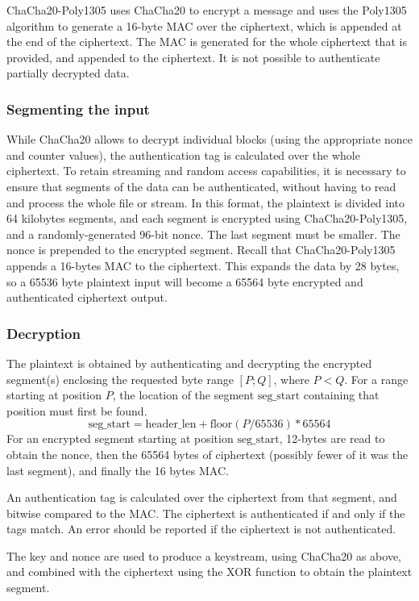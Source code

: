 ChaCha20-Poly1305 uses ChaCha20 to encrypt a message and uses the
Poly1305 algorithm to generate a 16-byte MAC over the ciphertext,
which is appended at the end of the ciphertext.
%
The MAC is generated for the whole ciphertext that is provided, and
appended to the ciphertext.
%
It is not possible to authenticate partially decrypted data.

\subsubsection{Segmenting the input}
%
While ChaCha20 allows to decrypt individual blocks (using the
appropriate nonce and counter values), the authentication tag is
calculated over the whole ciphertext.
%
To retain streaming and random access capabilities, it is necessary to
ensure that segments of the data can be authenticated, without having
to read and process the whole file or stream.
%
In this format, the plaintext is divided into 64 kilobytes segments,
and each segment is encrypted using ChaCha20-Poly1305, and a
randomly-generated 96-bit nonce. The last segment must be smaller.
%
The nonce is prepended to the encrypted segment. Recall that
ChaCha20-Poly1305 appends a 16-bytes MAC to the ciphertext.
%
This expands the data by 28 bytes, so a 65536 byte plaintext input
will become a 65564 byte encrypted and authenticated ciphertext
output.

\subsubsection{Decryption}
The plaintext is obtained by authenticating and decrypting the
encrypted segment(s) enclosing the requested byte range $[P;Q]$, where
$P<Q$.
%
For a range starting at position $P$, the location of the segment
$\text{seg\_start}$ containing that position must first be found.
%
$$\text{seg\_start} = \text{header\_len} + \text{floor}(P/65536) *
65564$$
%
For an encrypted segment starting at position $\text{seg\_start}$,
12-bytes are read to obtain the nonce, then the 65564 bytes of
ciphertext (possibly fewer of it was the last segment), and finally
the 16 bytes MAC.

An authentication tag is calculated over the ciphertext from that
segment, and bitwise compared to the MAC. The ciphertext is
authenticated if and only if the tags match.
%
An error should be reported if the ciphertext is not authenticated.

The key and nonce are used to produce a keystream, using ChaCha20 as
above, and combined with the ciphertext using the XOR function to
obtain the plaintext segment.

